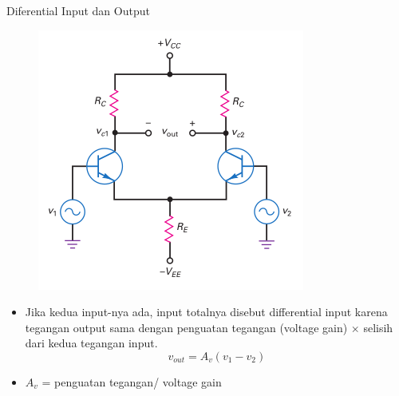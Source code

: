 \documentclass[aspectratio=169]{beamer}
\begin{document}
\begin{frame}{Diferential Input dan Output}
	\begin{multicols}{2}
		\begin{figure}
			\centering
			\includegraphics[height=0.7\textheight]{gambar/01.diff-amp/01.differential_input_output}
		\end{figure}
		\columnbreak
		\begin{itemize}
			\item Jika kedua input-nya ada, input totalnya disebut differential input karena tegangan output sama dengan penguatan tegangan (voltage gain) $ \times $ selisih dari kedua tegangan input.
			\begin{equation} \label{pers.2}
				v_{out} = A_v (v_1 - v_2)
			\end{equation}
			\item $ A_v $ = penguatan tegangan/ voltage gain
		\end{itemize}
	\end{multicols}
\end{frame}
\end{document}
